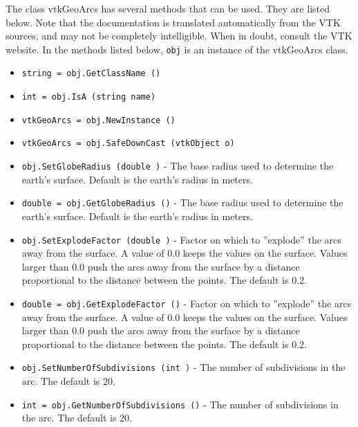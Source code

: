 The class vtkGeoArcs has several methods that can be used.
  They are listed below.
Note that the documentation is translated automatically from the VTK sources,
and may not be completely intelligible.  When in doubt, consult the VTK website.
In the methods listed below, \verb|obj| is an instance of the vtkGeoArcs class.
\begin{itemize}
\item  \verb|string = obj.GetClassName ()|

\item  \verb|int = obj.IsA (string name)|

\item  \verb|vtkGeoArcs = obj.NewInstance ()|

\item  \verb|vtkGeoArcs = obj.SafeDownCast (vtkObject o)|

\item  \verb|obj.SetGlobeRadius (double )| -  The base radius used to determine the earth's surface.
 Default is the earth's radius in meters.

\item  \verb|double = obj.GetGlobeRadius ()| -  The base radius used to determine the earth's surface.
 Default is the earth's radius in meters.

\item  \verb|obj.SetExplodeFactor (double )| -  Factor on which to ''explode'' the arcs away from the surface.
 A value of 0.0 keeps the values on the surface.
 Values larger than 0.0 push the arcs away from the surface by a distance
 proportional to the distance between the points.
 The default is 0.2.

\item  \verb|double = obj.GetExplodeFactor ()| -  Factor on which to ''explode'' the arcs away from the surface.
 A value of 0.0 keeps the values on the surface.
 Values larger than 0.0 push the arcs away from the surface by a distance
 proportional to the distance between the points.
 The default is 0.2.

\item  \verb|obj.SetNumberOfSubdivisions (int )| -  The number of subdivisions in the arc.
 The default is 20.

\item  \verb|int = obj.GetNumberOfSubdivisions ()| -  The number of subdivisions in the arc.
 The default is 20.

\end{itemize}
